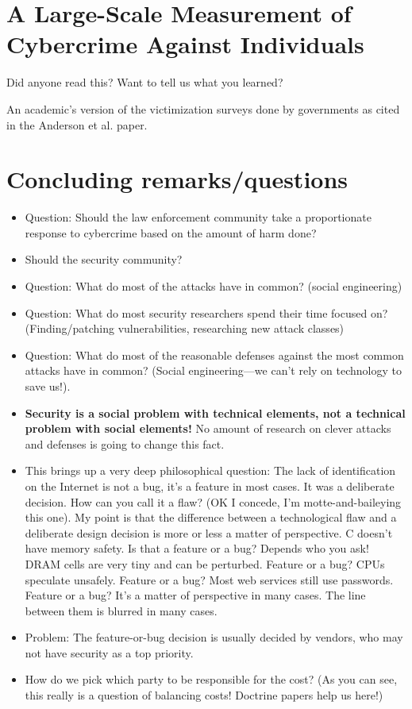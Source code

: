 \documentclass[11pt]{article}
\begin{document}
\section*{A Large-Scale Measurement of Cybercrime Against Individuals}

Did anyone read this? Want to tell us what you learned? 

An academic's version of the victimization surveys done by governments as cited in the Anderson et al. paper. 


\section*{Concluding remarks/questions}

\begin{itemize}
    \item Question: Should the law enforcement community take a proportionate response to cybercrime based on the amount of harm done?
    \item Should the security community?
    \item Question: What do most of the attacks have in common? (social engineering)
    \item Question: What do most security researchers spend their time focused on? (Finding/patching vulnerabilities, researching new attack classes)
    \item Question: What do most of the reasonable defenses against the most common attacks have in common? (Social engineering---we can't rely on technology to save us!). 
    \item {\bf Security is a social problem with technical elements, not a technical problem with social elements!} No amount of research on clever attacks and defenses is going to change this fact.
    \item This brings up a very deep philosophical question: The lack of identification on the Internet is not a bug, it's a feature in most cases. It was a deliberate decision. How can you call it a flaw? (OK I concede, I'm motte-and-baileying this one). My point is that the difference between a technological flaw and a deliberate design decision is more or less a matter of perspective. C doesn't have memory safety. Is that a feature or a bug? Depends who you ask! DRAM cells are very tiny and can be perturbed. Feature or a bug? CPUs speculate unsafely. Feature or a bug? Most web services still use passwords. Feature or a bug? It's a matter of perspective in many cases. The line between them is blurred in many cases.
    \item Problem: The feature-or-bug decision is usually decided by vendors, who may not have security as a top priority. 
    \item How do we pick which party to be responsible for the cost? (As you can see, this really is a question of balancing costs! Doctrine papers help us here!)
\end{itemize}
\end{document}
